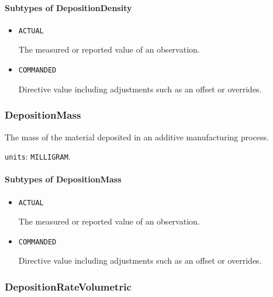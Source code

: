 \paragraph{Subtypes of DepositionDensity}\mbox{}
\label{sec:Subtypes of DepositionDensity}

\begin{itemize}

\item \texttt{ACTUAL}


The measured or reported value of an \gls{observation}.

\item \texttt{COMMANDED}


Directive value including adjustments such as an offset or overrides.


\end{itemize}





\subsubsection{DepositionMass}
\label{sec:DepositionMass}



The mass of the material deposited in an additive manufacturing process.


\texttt{units}: \texttt{MILLIGRAM}.

\paragraph{Subtypes of DepositionMass}\mbox{}
\label{sec:Subtypes of DepositionMass}

\begin{itemize}

\item \texttt{ACTUAL}


The measured or reported value of an \gls{observation}.

\item \texttt{COMMANDED}


Directive value including adjustments such as an offset or overrides.


\end{itemize}





\subsubsection{DepositionRateVolumetric}
\label{sec:DepositionRateVolumetric}



